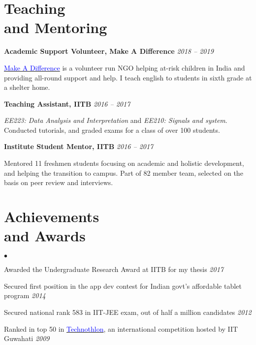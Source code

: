 \documentclass[margin,line,hidelinks]{res}
\newenvironment{list1}{
  \begin{list}{\ding{113}}{%
      \setlength{\itemsep}{0in}
      \setlength{\parsep}{0in} \setlength{\parskip}{0in}
      \setlength{\topsep}{0in} \setlength{\partopsep}{0in} 
      \setlength{\leftmargin}{0.17in}}}{\end{list}}
\newenvironment{list2}{
  \begin{list}{$\bullet$}{%
      \setlength{\itemsep}{0in}
      \setlength{\parsep}{0in} \setlength{\parskip}{0in}
      \setlength{\topsep}{0in} \setlength{\partopsep}{0in} 
      \setlength{\leftmargin}{0.2in}}}{\end{list}}
\begin{document}
\begin{resume}
\section{\sc Teaching \\ and Mentoring}
{\bf Academic Support Volunteer, Make A Difference} \hfill \textit{2018 -- 2019} \\
\vspace*{-.15in}
\begin{list1}
	\item[] \href{https://makeadiff.in/}{\textcolor{blue}{Make A Difference}} is a volunteer run NGO helping at-risk children in India and providing all-round support and help. I teach english to students in sixth grade at a shelter home.
\end{list1}

\vspace*{-0.1in}

{\bf Teaching Assistant, IITB} \hfill \textit{2016 -- 2017} \\
\vspace*{-.15in}
\begin{list1}
	\item[] \textit{EE223: Data Analysis and Interpretation} and \textit{EE210: Signals and system}. Conducted tutorials, and graded exams for a class of over 100 students.
\end{list1}

\vspace*{-0.1in}

{\bf Institute Student Mentor, IITB} \hfill \textit{2016 -- 2017} \\
\vspace*{-.15in}
\begin{list1}
	\item[] Mentored 11 freshmen students focusing on academic and holistic development, and helping the transition to campus. Part of 82 member team, selected on the basis on peer review and interviews.
\end{list1}


\section{\sc Achievements \\ and Awards}	
\begin{list2}
\item Awarded the Undergraduate Research Award at IITB for my thesis \hfill \textit{2017}
\item Secured first position in the app dev contest for Indian govt's affordable tablet program \hfill \textit{2014} 
\item Secured national rank 583 in IIT-JEE exam, out of half a million candidates \hfill \textit{2012}
\item Ranked in top 50 in \href{https://technothlon.techniche.org/}{\textcolor{blue}{Technothlon}}, an international competition hosted by IIT Guwahati \hfill \textit{2009}
\end{list2}



\end{resume}
\end{document}
